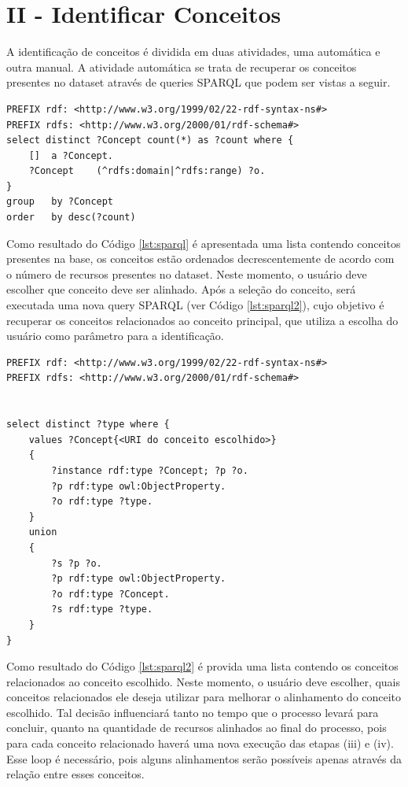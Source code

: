 \section{II - Identificar Conceitos}
A identificação de conceitos é dividida em duas atividades, uma automática e outra manual. A atividade automática se trata de recuperar os conceitos presentes no dataset através de queries SPARQL que podem ser vistas a seguir.
\\
\begin{lstlisting}[captionpos=b, caption=Query SPARQL para identificação de conceito, label=lst:sparql,
   basicstyle=\ttfamily,frame=single]
PREFIX rdf: <http://www.w3.org/1999/02/22-rdf-syntax-ns#>
PREFIX rdfs: <http://www.w3.org/2000/01/rdf-schema#>
select distinct ?Concept count(*) as ?count where {
	[] 	a ?Concept.
	?Concept 	(^rdfs:domain|^rdfs:range) ?o.
}
group 	by ?Concept	
order 	by desc(?count)
\end{lstlisting}

Como resultado do Código \ref{lst:sparql} é apresentada uma lista contendo conceitos presentes na base, os conceitos estão ordenados decrescentemente de acordo com o número de recursos presentes no dataset. Neste momento, o usuário deve escolher que conceito deve ser alinhado. Após a seleção do conceito, será executada uma nova query SPARQL (ver Código \ref{lst:sparql2}), cujo objetivo é recuperar os conceitos relacionados ao conceito principal, que utiliza a escolha do usuário como parâmetro para a identificação.

\begin{lstlisting}[captionpos=b, caption=Query SPARQL para recuperação de conceitos relacionados, label=lst:sparql2,
   basicstyle=\ttfamily,frame=single]
PREFIX rdf: <http://www.w3.org/1999/02/22-rdf-syntax-ns#>
PREFIX rdfs: <http://www.w3.org/2000/01/rdf-schema#>


select distinct ?type where {
	values ?Concept{<URI do conceito escolhido>}
	{
		?instance rdf:type ?Concept; ?p ?o.
		?p rdf:type owl:ObjectProperty.
		?o rdf:type ?type.
	}
	union
	{
		?s ?p ?o.
		?p rdf:type owl:ObjectProperty.
		?o rdf:type ?Concept.
		?s rdf:type ?type.
	}
}

\end{lstlisting}

Como resultado do Código \ref{lst:sparql2} é provida uma lista contendo os conceitos relacionados ao conceito escolhido. Neste momento, o usuário deve escolher, quais conceitos relacionados ele deseja utilizar para melhorar o alinhamento do conceito escolhido. Tal decisão influenciará tanto no tempo que o processo levará para concluir, quanto na quantidade de recursos alinhados ao final do processo, pois para cada conceito relacionado haverá uma nova execução das etapas (iii) e (iv). Esse loop é necessário, pois alguns alinhamentos serão possíveis apenas através da relação entre esses conceitos.

